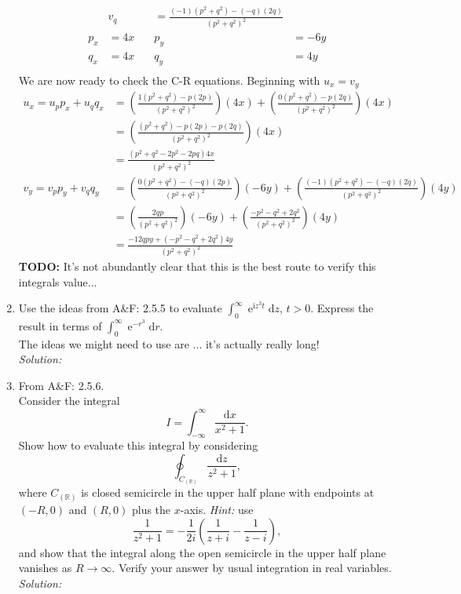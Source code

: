 \documentclass[10pt]{amsart}
\newcommand{\D}{\mathrm{d}}
\newcommand{\I}{\mathrm{i}}
\DeclareMathOperator{\E}{e}
\theoremstyle{nonumberplain}
\begin{document}
\begin{enumerate}[label={\bf {\arabic*}:}]
\begin{align*}
	\quad &v_q& = \frac{(-1)\left(p^2 + q^2\right) - (-q)\left(2q\right)}{\left(p^2 + q^2\right)^2} \\	
p_x &= 4x
	\quad &p_y& = -6y \\
q_x &= 4x 
	\quad &q_y& = 4y \\	
\end{align*}
We are now ready to check the C-R equations.
Beginning with $u_x = v_y$
\begin{align*}
u_x = u_pp_x + u_qq_x &= \left( \frac{1\left(p^2 + q^2\right) - p\left(2p\right)}{\left(p^2 + q^2\right)^2} \right)\left(4x\right)
	+ \left(\frac{0\left(p^2 + q^2\right) - p\left(2q\right)}{\left(p^2 + q^2\right)^2}\right)\left(4x\right) \\
	&= \left( \frac{\left(p^2 + q^2\right) - p\left(2p\right) - p\left(2q\right)}{\left(p^2 + q^2\right)^2} \right)\left(4x\right) \\
	&= \frac{\left( p^2 + q^2 - 2p^2 - 2pq\right)4x}{\left(p^2 + q^2\right)^2} \\
v_y = v_pp_y + v_qq_y &= \left( \frac{0\left(p^2 + q^2\right) - (-q)\left(2p\right)}{\left(p^2 + q^2\right)^2} \right)\left(-6y\right)
	+ \left(\frac{(-1)\left(p^2 + q^2\right) - (-q)\left(2q\right)}{\left(p^2 + q^2\right)^2}\right) \left( 4y \right) \\
	&= \left( \frac{ 2qp}{\left(p^2 + q^2\right)^2} \right)\left(-6y\right)
	+ \left(\frac{-p^2 - q^2 + 2q^2}{\left(p^2 + q^2\right)^2}\right) \left( 4y \right) \\
	&= \frac{ -12qpy + \left(-p^2 - q^2 + 2q^2\right)4y}{\left(p^2 + q^2\right)^2}
\end{align*}
\textbf{TODO:} It's not abundantly clear that this is the best route to verify this integrals value...
\\

\item Use the ideas from A\&F: 2.5.5 to evaluate $\int_0^\infty \E^{\I
    z^3 t} \D z$, $t > 0$.  Express the result in terms of $\int_0^\infty \E^{-
    r^3} \D r$. \\
The ideas we might need to use are ... it's actually really long! \\
\textit{Solution:}\\
\item From A\&F: 2.5.6. \\
Consider the integral $$I = \int_{-\infty}^{\infty} \frac{\D x}{x^2 + 1}.$$
Show how to evaluate this integral by considering
$$\oint_{C_{(\mathbb R)}} \frac{\D z}{z^2 + 1},$$
where $C_{(\mathbb R)}$ is closed semicircle in the upper half plane with endpoints at $(-R, 0)$ and $(R, 0)$ plus the $x$-axis.
\textit{Hint:} use
$$\frac{1}{z^2 + 1} = -\frac{1}{2i}\left(\frac{1}{z + i} - \frac{1}{z - i}\right),$$
and show that the integral along the open semicircle in the upper half plane vanishes as $R \rightarrow \infty$.
Verify your answer by usual integration in real variables.
\textit{Solution:}\\
\\


\end{enumerate}
\end{document}
